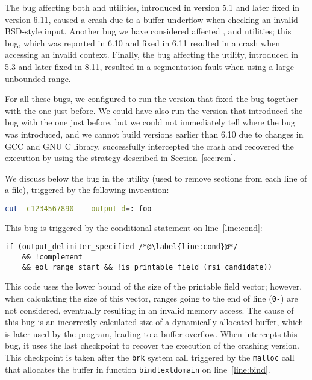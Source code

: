 The bug affecting both \mdsum and \shasum utilities, introduced in version 5.1
and later fixed in version 6.11, caused a crash due to a buffer underflow when
checking an invalid BSD-style input. Another bug we have considered affected
\mkdir, \mkfifo and \mknod utilities; this bug, which was reported in 6.10 and
fixed in 6.11 resulted in a crash when accessing an invalid context.  Finally,
the bug affecting the \cut utility, introduced in 5.3 and later fixed in 8.11,
resulted in a segmentation fault when using a large unbounded range. 

For all these bugs, we configured \mx to run the version that fixed the
bug together with the one just before. We could have also run the
version that introduced the bug with the one just before, but we could
not immediately tell where the bug was introduced, and we cannot build
versions earlier than 6.10 due to changes in GCC and GNU C library. \mx
successfully intercepted the crash and recovered the execution by using
the strategy described in Section~\ref{sec:rem}.

We discuss below the bug in the \cut utility (used to remove sections
from each line of a file), triggered by the following invocation:

\begin{lstlisting}[numbers=none,breaklines=true,xleftmargin=0pt,language=bash]
cut -c1234567890- --output-d=: foo
\end{lstlisting}

This bug is triggered by the conditional statement on line~\ref{line:cond}:

\begin{lstlisting}[firstnumber=525]
if (output_delimiter_specified /*@\label{line:cond}@*/
    && !complement
    && eol_range_start && !is_printable_field (rsi_candidate))
\end{lstlisting}

This code uses the lower bound of the size of the printable field
vector; however, when calculating the size of this vector, ranges going
to the end of line (\ie \lstinline`0-`) are not considered, eventually
resulting in an invalid memory access. The cause of this bug is an incorrectly
calculated size of a dynamically allocated buffer, which is later used by the
program, leading to a buffer overflow. When \mx intercepts this bug, it uses
the last checkpoint to recover the execution of the crashing version. This
checkpoint is taken after the \lstinline`brk` system call triggered by the
\lstinline`malloc` call that allocates the buffer in function
\lstinline`bindtextdomain` on line~\ref{line:bind}.

